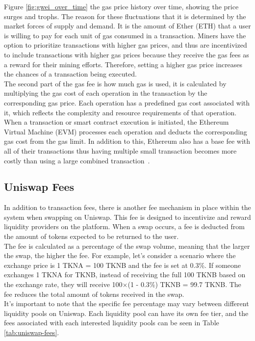 \noindent Figure \ref{fig:gwei_over_time} the gas price history over time, showing the price surges and trophs. The reason for these fluctuations that it is determined by the market forces of supply and demand. It is the amount of Ether (ETH) that a user is willing to pay for each unit of gas consumed in a transaction. Miners have the option to prioritize transactions with higher gas prices, and thus are incentivized to include transactions with higher gas prices because they receive the gas fees as a reward for their mining efforts. Therefore, setting a higher gas price increases the chances of a transaction being executed.
\\[5mm]
The second part of the gas fee is how much gas is used, it is calculated by multiplying the gas cost of each operation in the transaction by the corresponding gas price. Each operation has a predefined gas cost associated with it, which reflects the complexity and resource requirements of that operation. When a transaction or smart contract execution is initiated, the Ethereum Virtual Machine (EVM) processes each operation and deducts the corresponding gas cost from the gas limit. In addition to this, Ethereum also has a base fee with all of their transactions thus having multiple small transaction becomes more costly than using a large combined transaction~\cite{noauthor_gas_nodate}.

\subsection{Uniswap Fees}
In addition to transaction fees, there is another fee mechanism in place within the system when swapping on Uniswap. This fee is designed to incentivize and reward liquidity providers on the platform. When a swap occurs, a fee is deducted from the amount of tokens expected to be returned to the user.
\\[5mm]
The fee is calculated as a percentage of the swap volume, meaning that the larger the swap, the higher the fee. For example, let's consider a scenario where the exchange price is 1 TKNA = 100 TKNB and the fee is set at 0.3\%. If someone exchanges 1 TKNA for TKNB, instead of receiving the full 100 TKNB based on the exchange rate, they will receive 100$\times$(1 - 0.3\%) TKNB = 99.7 TKNB. The fee reduces the total amount of tokens received in the swap.
\\[5mm]
It's important to note that the specific fee percentage may vary between different liquidity pools on Uniswap. Each liquidity pool can have its own fee tier, and the fees associated with each interested liquidity pools can be seen in Table \ref{tab:uniswap-fees}.

